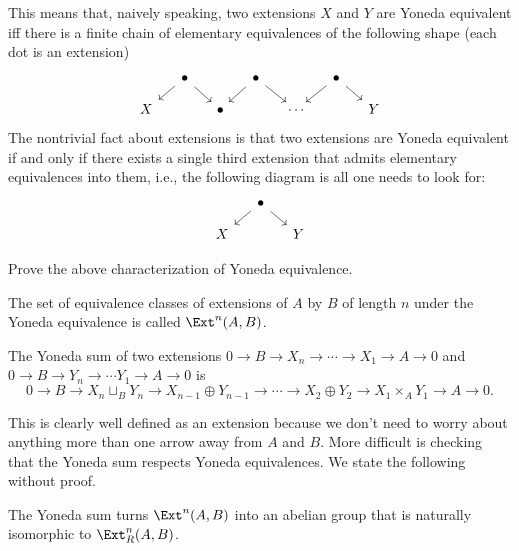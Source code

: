 This means that, naively speaking, two extensions $X$ and $Y$ are Yoneda equivalent iff there is a finite chain of elementary equivalences of the following shape (each dot is an extension)
    \[\begin{tikzcd}[column sep=small,row sep=small]
                 & \bullet\arrow[dl]\arrow[dr]&         & \bullet\arrow[dl]\arrow[dr] &         &  \bullet\arrow[dl]\arrow[dr] \\
        X  &                             &\bullet &                             &\cdots &                             &Y 
    \end{tikzcd}\]
The nontrivial fact about extensions is that two extensions are Yoneda equivalent  if and only if there exists a single third extension that admits elementary equivalences into them, i.e., the following diagram is all one needs to look for:
    \[\begin{tikzcd}[column sep=small,row sep=small]
                 & \bullet\arrow[dl]\arrow[dr]&         \\
        X  &                                & Y
    \end{tikzcd}\]


\begin{xca}
    Prove the above characterization of Yoneda equivalence.
\end{xca}

\begin{defn}
    The set of equivalence classes of extensions of $A$ by $B$ of length $n$ under the Yoneda equivalence is called $\Ext^n(A,B)$.
\end{defn}

\begin{defn}
    The Yoneda sum of two extensions $0\to B\to X_n\to\cdots \to X_1\to A\to 0$ and $0\to B\to Y_n\to \cdots Y_1\to A\to 0$ is 
    \[0\to B\to X_n\sqcup_B Y_n\to X_{n-1}\oplus Y_{n-1}\to \cdots \to X_2\oplus Y_2\to X_1\times_A Y_1\to A\to 0.\]
\end{defn}

This is clearly well defined as an extension because we don't need to worry about anything more than one arrow away from $A$ and $B$. More difficult is checking that the Yoneda sum respects Yoneda equivalences. We state the following without proof.

\begin{thm}
    The Yoneda sum turns $\Ext^n(A,B)$ into an abelian group that is naturally isomorphic to $\Ext^n_R(A,B)$.
\end{thm}


